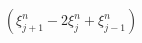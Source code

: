 \documentclass[preview]{standalone}
\begin{document}
\begin{align*}
\left(\xi_{j+1}^{n} - 2 \xi_{j}^{n} + \xi_{j-1}^{n}\right)
\end{align*}
\end{document}

